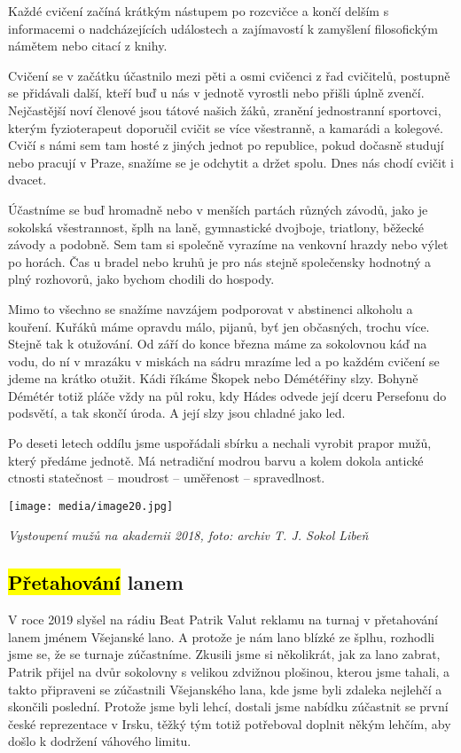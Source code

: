 Každé cvičení začíná krátkým nástupem po rozcvičce a končí delším s
informacemi o nadcházejících událostech a zajímavostí k zamyšlení
filosofickým námětem nebo citací z knihy.

Cvičení se v začátku účastnilo mezi pěti a osmi cvičenci z řad
cvičitelů, postupně se přidávali další, kteří buď u nás v jednotě
vyrostli nebo přišli úplně zvenčí. Nejčastější noví členové jsou tátové
našich žáků, zranění jednostranní sportovci, kterým fyzioterapeut
doporučil cvičit se více všestranně, a kamarádi a kolegové. Cvičí s námi
sem tam hosté z jiných jednot po republice, pokud dočasně studují nebo
pracují v Praze, snažíme se je odchytit a držet spolu. Dnes nás chodí
cvičit i dvacet.

Účastníme se buď hromadně nebo v menších partách různých závodů, jako je
sokolská všestrannost, šplh na laně, gymnastické dvojboje, triatlony,
běžecké závody a podobně. Sem tam si společně vyrazíme na venkovní
hrazdy nebo výlet po horách. Čas u bradel nebo kruhů je pro nás stejně
společensky hodnotný a plný rozhovorů, jako bychom chodili do hospody.

Mimo to všechno se snažíme navzájem podporovat v abstinenci alkoholu a
kouření. Kuřáků máme opravdu málo, pijanů, byť jen občasných, trochu
více. Stejně tak k otužování. Od září do konce března máme za sokolovnou
káď na vodu, do ní v mrazáku v miskách na sádru mrazíme led a po každém
cvičení se jdeme na krátko otužit. Kádi říkáme Škopek nebo Démétéřiny
slzy. Bohyně Démétér totiž pláče vždy na půl roku, kdy Hádes odvede její
dceru Persefonu do podsvětí, a tak skončí úroda. A její slzy jsou
chladné jako led.

Po deseti letech oddílu jsme uspořádali sbírku a nechali vyrobit prapor
mužů, který předáme jednotě. Má netradiční modrou barvu a kolem dokola
antické ctnosti statečnost -- moudrost -- uměřenost -- spravedlnost.

\texttt{[image: media/image20.jpg]}

\emph{Vystoupení mužů na akademii 2018, foto: archiv T. J. Sokol Libeň}

\subsection{\texorpdfstring{\hl{Přetahování}
lanem}{Přetahování lanem}}\label{pux159etahovuxe1nuxed-lanem}

V roce 2019 slyšel na rádiu Beat Patrik Valut reklamu na turnaj v
přetahování lanem jménem Všejanské lano. A protože je nám lano blízké ze
šplhu, rozhodli jsme se, že se turnaje zúčastníme. Zkusili jsme si
několikrát, jak za lano zabrat, Patrik přijel na dvůr sokolovny s
velikou zdvižnou plošinou, kterou jsme tahali, a takto připraveni se
zúčastnili Všejanského lana, kde jsme byli zdaleka nejlehčí a skončili
poslední. Protože jsme byli lehcí, dostali jsme nabídku zúčastnit se
první české reprezentace v Irsku, těžký tým totiž potřeboval doplnit
někým lehčím, aby došlo k dodržení váhového limitu.

